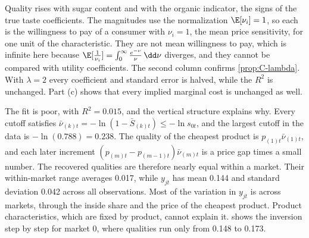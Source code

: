Quality rises with sugar content and with the organic indicator, the signs of the true taste coefficients. The
magnitudes use the normalization $\E[\nu_i] = 1$, so each is the willingness to pay of a consumer with $\nu_i = 1$, the mean
price sensitivity, for one unit of the characteristic. They are not mean willingness to pay, which is infinite here because $\E[\frac{1}{\nu_i}] = \int_0^\infty
\frac{e^{-\nu}}{\nu}\,\dd\nu$ diverges, and they cannot be compared with utility coefficients. The second column
confirms \cref{prop:C-lambda}. With $\lambda = 2$ every coefficient and standard error is halved, while the $R^2$ is
unchanged. Part (c) shows that every implied marginal cost is unchanged as well.

The fit is poor, with $R^2 = 0.015$, and the vertical structure explains why. Every cutoff satisfies
$\bar\nu_{(k)t} = -\ln(1 - \bar S_{(k)t}) \le -\ln s_{0t}$, and the largest cutoff in the data is $-\ln(0.788) = 0.238$.
The quality of the cheapest product is $p_{(1)t}\bar\nu_{(1)t}$, and each later increment
$(p_{(m)t} - p_{(m-1)t})\bar\nu_{(m)t}$ is a price gap times a small number. The recovered qualities are therefore nearly
equal within a market. Their within-market range averages 0.017, while $y_{jt}$ has mean 0.144 and standard deviation
0.042 across all observations. Most of the variation in $y_{jt}$ is across markets, through the inside share and the
price of the cheapest product. Product characteristics, which are fixed by product, cannot explain it.
 shows the inversion step by step for market 0, where qualities run only from 0.148 to 0.173.

